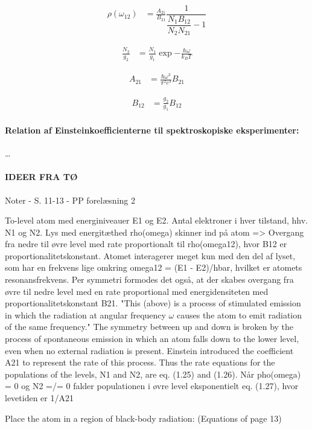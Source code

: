 \begin{align}
    \rho(\omega_{12}) &= \frac{A_{21}}{B_{21}} \dfrac{1}{\dfrac{N_1 B_{12}}{N_2 N_{21}} - 1}
\end{align}

\begin{align}
    \frac{N_2}{g_2} &= \frac{N_1}{g_1}\exp{-\frac{\hbar\omega}{k_B T}}
\end{align}

\begin{align}
    A_{21} & =\frac{\hbar\omega^3}{\pi^2c^3} B_{21}
\end{align}

\begin{align}
    B_{12} &= \frac{g_2}{g_1} B_{12}
\end{align}


\paragraph{Relation af Einsteinkoefficienterne til spektroskopiske eksperimenter:} \ldots




\paragraph{IDEER FRA TØ}

Noter
- S. 11-13
- PP forelæsning 2

To-level atom med energiniveauer E1 og E2. Antal elektroner i hver tilstand, hhv. N1 og N2.
Lys med energitæthed rho(omega) skinner ind på atom => Overgang fra nedre til øvre level med rate proportionalt til rho(omega12), hvor B12 er proportionalitetskonstant. Atomet interagerer meget kun med den del af lyset, som har en frekvens lige omkring omega12 = (E1 - E2)/hbar, hvilket er atomets resonansfrekvens.
Per symmetri formodes det også, at der skabes overgang fra øvre til nedre level med en rate proportional med energidensiteten med proportionalitetskonstant B21.
"This (above) is a process of stimulated emission in which the radiation
at angular frequency $\omega$ causes the atom to emit radiation of the same
frequency."
The symmetry between up and down is broken by the process of spontaneous emission in which an atom falls down to the lower level, even when no external radiation is present. Einstein introduced the coefficient A21 to represent the rate of this process. Thus the rate equations for the populations of the levels, N1 and N2, are eq. (1.25) and (1.26).
Når pho(omega) = 0 og N2 =/= 0 falder populationen i øvre level eksponentielt eq. (1.27), hvor levetiden er 1/A21

Place the atom in a region of black-body radiation: (Equations of page 13)